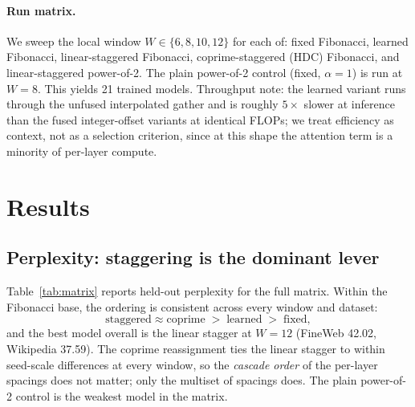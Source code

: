 \documentclass[11pt]{article}
\begin{document}
\paragraph{Run matrix.}
We sweep the local window $W \in \{6,8,10,12\}$ for each of: fixed Fibonacci,
learned Fibonacci, linear-staggered Fibonacci, coprime-staggered (HDC)
Fibonacci, and linear-staggered power-of-2. The plain power-of-2 control (fixed,
$\alpha=1$) is run at $W=8$. This yields 21 trained models. Throughput note: the
learned variant runs through the unfused interpolated gather and is roughly
$5\times$ slower at inference than the fused integer-offset variants at identical
FLOPs; we treat efficiency as context, not as a selection criterion, since at
this shape the attention term is a minority of per-layer compute.

\section{Results}
\label{sec:results}

\subsection{Perplexity: staggering is the dominant lever}

Table~\ref{tab:matrix} reports held-out perplexity for the full matrix. Within
the Fibonacci base, the ordering is consistent across every window and dataset:
\[
\text{staggered} \approx \text{coprime} \;>\; \text{learned} \;>\; \text{fixed},
\]
and the best model overall is the linear stagger at $W=12$ (FineWeb 42.02,
Wikipedia 37.59). The coprime reassignment ties the linear stagger to within
seed-scale differences at every window, so the \emph{cascade order} of the
per-layer spacings does not matter; only the multiset of spacings does. The
plain power-of-2 control is the weakest model in the matrix.
\end{document}
